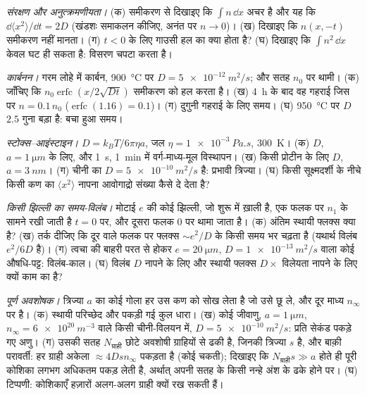 \begin{exercise}[$\star\star$]\label{exo:b2:particle-diffusion:7}
\emph{संरक्षण और अनुत्क्रमणीयता।} (क) समीकरण से दिखाइए
कि $\int n\,\dd x$ अचर है और यह कि $\dd\langle x^2\rangle/\dd t =
2D$ (खंडशः समाकलन कीजिए, अनंत पर $n \to 0$)। (ख) दिखाइए कि
$n(x,-t)$ समीकरण नहीं मानता। (ग) $t < 0$ के लिए
गाउसी हल का क्या होता है? (घ) दिखाइए कि $\int n^2\,\dd x$ केवल
घट ही सकता है: विसरण चपटा करता है।
\end{exercise}

\begin{exercise}[$\star\star$]\label{exo:b2:particle-diffusion:8}
\emph{कार्बनन।} गरम लोहे में कार्बन, \qty{900}{\celsius} पर $D = \qty{5e-12}{m^2/s}$;
और सतह $n_0$ पर थामी। (क) जाँचिए कि $n_0
\operatorname{erfc}(x/2\sqrt{Dt})$ समीकरण को हल करता है। (ख) \qty{4}{h} के बाद वह गहराई
जिस पर $n = 0.1\,n_0$ ($\operatorname{erfc}(1.16) = 0.1$)।
(ग) दुगुनी गहराई के लिए समय। (घ) \qty{950}{\celsius} पर $D$ $2.5$
गुना बड़ा है: बचा हुआ समय।
\end{exercise}

\begin{exercise}[$\star\star$]\label{exo:b2:particle-diffusion:9}
\emph{स्टोक्स--आइंस्टाइन।} $D = k_BT/6\pi\eta a$, जल $\eta =
\qty{1e-3}{Pa.s}$, \qty{300}{K}। (क) $D$, $a = \qty{1}{\micro m}$ के लिए, और
\qty{1}{s}, \qty{1}{min} में वर्ग-माध्य-मूल विस्थापन। (ख) किसी प्रोटीन के लिए $D$,
$a = \qty{3}{nm}$। (ग) चीनी का $D = \qty{5e-10}{m^2/s}$ है:
प्रभावी त्रिज्या। (घ) किसी सूक्ष्मदर्शी के नीचे किसी कण का $\langle x^2\rangle$
नापना आवोगाद्रो संख्या कैसे दे देता है?
\end{exercise}

\begin{exercise}[$\star\star\star$]\label{exo:b2:particle-diffusion:10}
\emph{किसी झिल्ली का समय-विलंब।} मोटाई $e$ की कोई झिल्ली, जो शुरू में
ख़ाली है, एक फलक पर $n_1$ के सामने रखी जाती है $t = 0$ पर, और दूसरा फलक
$0$ पर थामा जाता है। (क) अंतिम स्थायी फ्लक्स क्या है? (ख) तर्क दीजिए कि दूर वाले फलक पर
फ्लक्स $\sim e^2/D$ के किसी समय भर चढ़ता है (यथार्थ विलंब
$e^2/6D$ है)। (ग) त्वचा की बाहरी परत से होकर $e = \qty{20}{\micro m}$, $D =
\qty{1e-13}{m^2/s}$ वाला कोई औषधि-पट्ट: विलंब-काल। (घ) विलंब
$D$ नापने के लिए और स्थायी फ्लक्स $D \times$ विलेयता नापने के लिए क्यों
काम का है?
\end{exercise}

\begin{exercise}[$\star\star\star$]\label{exo:b2:particle-diffusion:11}
\emph{पूर्ण अवशोषक।} त्रिज्या $a$ का कोई गोला हर उस कण को सोख लेता है
जो उसे छू ले, और दूर माध्य $n_\infty$ पर है। (क)
स्थायी परिच्छेद और पकड़ी गई कुल धारा। (ख) कोई जीवाणु, $a =
\qty{1}{\micro m}$, $n_\infty = \qty{6e20}{m^{-3}}$ वाले किसी चीनी-विलयन में,
$D = \qty{5e-10}{m^2/s}$: प्रति सेकंड पकड़े गए अणु। (ग) उसकी
सतह $N_{\text{ग्राही}}$ छोटे अवशोषी ग्राहियों से ढकी है, जिनकी त्रिज्या $s$ है,
और बाक़ी परावर्ती: हर ग्राही अकेला $\approx
4Ds n_\infty$ पकड़ता है (कोई चकती); दिखाइए कि $N_{\text{ग्राही}} s \gg a$ होते ही पूरी कोशिका लगभग
अधिकतम पकड़ लेती है, अर्थात् अपनी सतह के किसी नन्हे अंश के ढके होने पर।
(घ) टिप्पणी: कोशिकाएँ हज़ारों अलग-अलग ग्राही क्यों रख सकती हैं।
\end{exercise}

